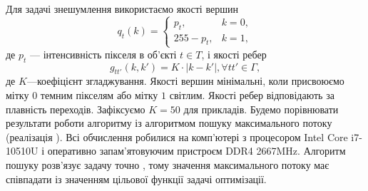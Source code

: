 Для задачі знешумлення використаємо якості вершин 
\begin{equation*}
    q_t(k) = 
    \begin{cases}
        p_t, & k = 0,\\
        255-p_t, & k = 1,
    \end{cases}
\end{equation*}
де $p_t$ --- інтенсивність пікселя в об'єкті $t\in T$, 
і якості ребер
\begin{equation*}
    g_{tt'}(k,k') = K\cdot|k-k'|, \forall tt'\in\Gamma,
\end{equation*}
де $K$---коефіцієнт згладжування.
Якості вершин мінімальні, коли присвоюємо мітку $0$ темним пікселям або мітку $1$ світлим.
Якості ребер відповідають за плавність переходів. Зафіксуємо $K=50$ для прикладів.
Будемо порівнювати результати роботи алгоритму із алгоритмом
пошуку максимального потоку (реалізація \cite{Boykov}). Всі обчислення робилися
на комп'ютері з процесором Intel Core i7-10510U і оперативно
запам'ятовуючим пристроєм DDR4 2667MHz. Алгоритм пошуку розв'язує задачу точно \cite{Boykov,Boykov_2,ishikawa,savchynskyy}, тому
значення максимального потоку має співпадати із значенням цільової функції задачі
оптимізації.
